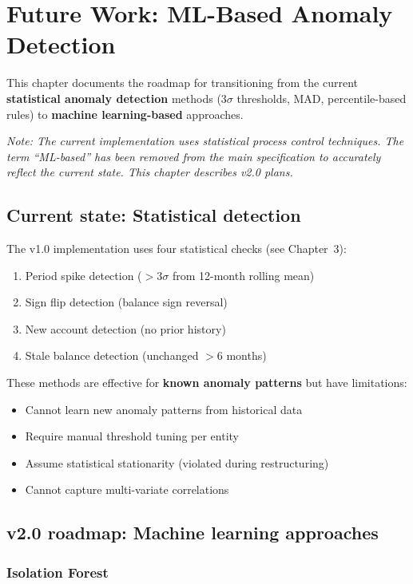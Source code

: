 \chapter{Future Work: ML-Based Anomaly Detection}\label{ch:future-ml}

This chapter documents the roadmap for transitioning from the current
\textbf{statistical anomaly detection} methods (3$\sigma$ thresholds, MAD,
percentile-based rules) to \textbf{machine learning-based} approaches.

\textit{Note: The current implementation uses statistical process control
techniques. The term ``ML-based'' has been removed from the main specification
to accurately reflect the current state. This chapter describes v2.0 plans.}

\section{Current state: Statistical detection}

The v1.0 implementation uses four statistical checks (see Chapter~3):
\begin{enumerate}
  \item Period spike detection ($>3\sigma$ from 12-month rolling mean)
  \item Sign flip detection (balance sign reversal)
  \item New account detection (no prior history)
  \item Stale balance detection (unchanged $>$6 months)
\end{enumerate}

These methods are effective for \textbf{known anomaly patterns} but have
limitations:
\begin{itemize}
  \item Cannot learn new anomaly patterns from historical data
  \item Require manual threshold tuning per entity
  \item Assume statistical stationarity (violated during restructuring)
  \item Cannot capture multi-variate correlations
\end{itemize}

\section{v2.0 roadmap: Machine learning approaches}

\subsection{Isolation Forest}

